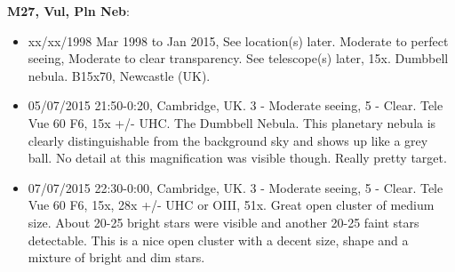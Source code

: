{\bf M27, Vul, Pln Neb}:
\begin{itemize}
\item xx/xx/1998 Mar 1998 to Jan 2015, See location(s) later. Moderate to perfect seeing, Moderate to clear transparency. See telescope(s) later, 15x. Dumbbell nebula. B15x70, Newcastle (UK).
\item 05/07/2015 21:50-0:20, Cambridge, UK. 3 - Moderate seeing, 5 - Clear. Tele Vue 60 F6, 15x +/- UHC. The Dumbbell Nebula. This planetary nebula is clearly distinguishable from the background sky and shows up like a grey ball. No detail at this magnification was visible though. Really pretty target.
\item 07/07/2015 22:30-0:00, Cambridge, UK. 3 - Moderate seeing, 5 - Clear. Tele Vue 60 F6, 15x, 28x +/- UHC or OIII, 51x. Great open cluster of medium size. About 20-25 bright stars were visible and another 20-25 faint stars detectable. This is a nice open cluster with a decent size, shape and a mixture of bright and dim stars.
\end{itemize}

